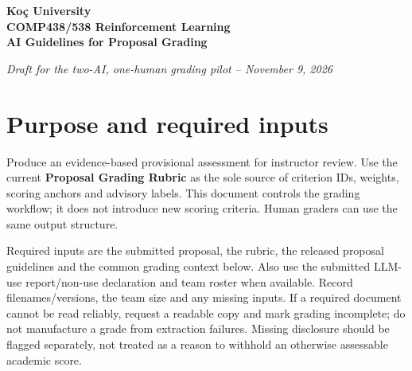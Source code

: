 \documentclass{article}
\begin{document}
\begin{center}
{\Large\bfseries Ko\c{c} University\\COMP438/538 Reinforcement Learning\\AI Guidelines for Proposal Grading\par}
\vspace{4pt}
\textit{Draft for the two-AI, one-human grading pilot -- November 9, 2026}
\end{center}

\section*{Purpose and required inputs}
Produce an evidence-based provisional assessment for instructor review. Use the current \textbf{Proposal Grading Rubric} as the sole source of criterion IDs, weights, scoring anchors and advisory labels. This document controls the grading workflow; it does not introduce new scoring criteria. Human graders can use the same output structure.

Required inputs are the submitted proposal, the rubric, the released proposal guidelines and the common grading context below. Also use the submitted LLM-use report/non-use declaration and team roster when available. Record filenames/versions, the team size and any missing inputs. If a required document cannot be read reliably, request a readable copy and mark grading incomplete; do not manufacture a grade from extraction failures. Missing disclosure should be flagged separately, not treated as a reason to withhold an otherwise assessable academic score.
\end{document}
